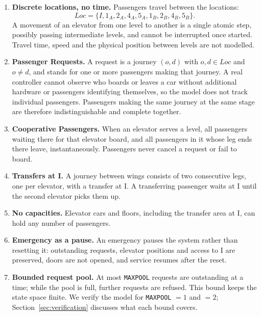 \begin{enumerate}[leftmargin=2.2em,itemsep=0.45\baselineskip]
  \item \textbf{Discrete locations, no time.} Passengers travel between the locations:
  \[
    Loc=\{I,1_A,2_A,4_A,5_A,1_B,2_B,4_B,5_B\}.
  \]
  A movement of an elevator from one level to another is a single atomic step, possibly passing intermediate levels, and cannot be interrupted once started. Travel time, speed and the physical position between levels are not modelled.

  \item \textbf{Passenger Requests.} A request is a journey \((o,d)\) with \(o,d\in Loc\) and \(o\neq d\), and stands for one or more passengers making that journey. A real controller cannot observe who boards or leaves a car without additional hardware or passengers identifying themselves, so the model does not track individual passengers. Passengers making the same journey at the same stage are therefore indistinguishable and complete together.

  \item \textbf{Cooperative Passengers.} When an elevator serves a level, all passengers waiting there for that elevator board, and all passengers in it whose leg ends there leave, instantaneously. Passengers never cancel a request or fail to board.

  \item \textbf{Transfers at I.} A journey between wings consists of two consecutive legs, one per elevator, with a transfer at I. A transferring passenger waits at I until the second elevator picks them up.

  \item \textbf{No capacities.} Elevator cars and floors, including the transfer area at I, can hold any number of passengers.

  \item \textbf{Emergency as a pause.} An emergency pauses the system rather than resetting it: outstanding requests, elevator positions and access to I are preserved, doors are not opened, and service resumes after the reset.

  \item \textbf{Bounded request pool.} At most \texttt{MAXPOOL} requests are outstanding at a time; while the pool is full, further requests are refused. This bound keeps the state space finite. We verify the model for \texttt{MAXPOOL} \(=1\) and \(=2\); Section~\ref{sec:verification} discusses what each bound covers.
\end{enumerate}

